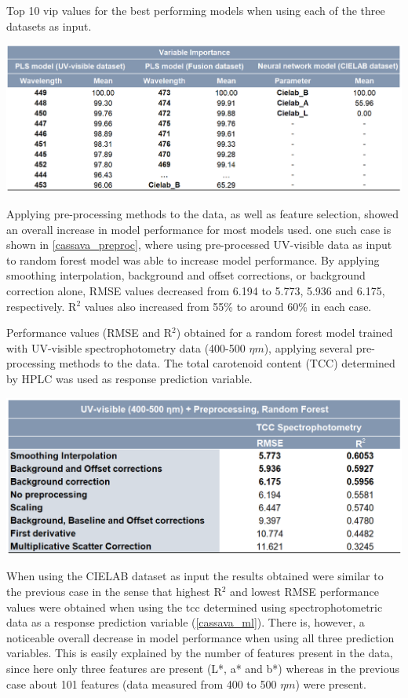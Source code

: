 \begin{table}[h]
	\centering
	\caption{Top 10 \acrfull{vip} values for the best performing models when using each of the three datasets as input.}
	\includegraphics[width=0.9\linewidth]{Imagens/Case_study/ml_vips}
	\label{cassava_vips}
\end{table}


Applying pre-processing methods to the data, as well as feature selection, showed an overall increase in model performance for most models used. one such case is shown in \autoref{cassava_preproc}, where using pre-processed UV-visible data as input to random forest model was able to increase model performance. By applying smoothing interpolation, background and offset corrections, or background correction alone, RMSE values decreased from 6.194 to 5.773, 5.936 and 6.175, respectively. R$^{2}$ values also increased from 55\% to around 60\% in each case.

\begin{table}[h]
	\centering
	\caption{Performance values (RMSE and R$^{2}$) obtained for a random forest model trained with UV-visible spectrophotometry data (400-500 $\eta m$), applying several pre-processing methods to the data. The total carotenoid content (TCC) determined by HPLC was used as response prediction variable.}
	\includegraphics[width=0.9\linewidth]{Imagens/Case_study/ml_preproc}
	\label{cassava_preproc}
\end{table}


When using the CIELAB dataset as input the results obtained were similar to the previous case in the sense that highest R$^{2}$ and lowest RMSE performance values were obtained when using the \gls{tcc} determined using spectrophotometric data as a response prediction variable (\autoref{cassava_ml}). There is, however, a noticeable overall decrease in model performance when using all three prediction variables. This is easily explained by the number of features present in the data, since here only three features are present (L*, a* and b*) whereas in the previous case about 101 features (data measured from 400 to 500 $\eta m$) were present.

